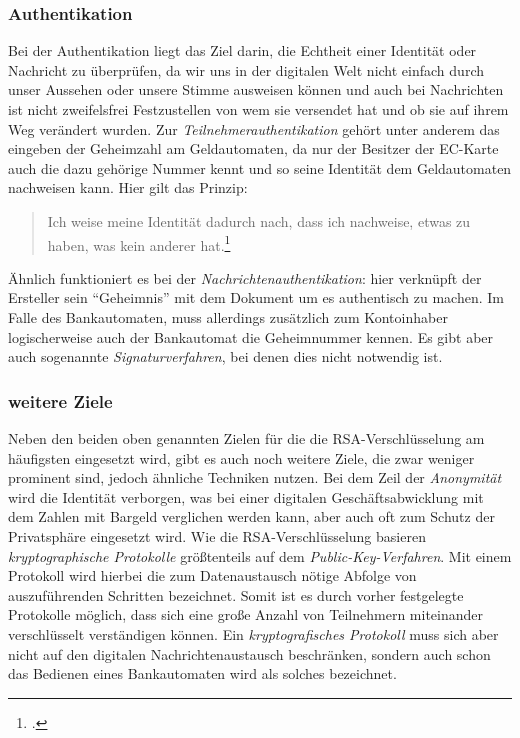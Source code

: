 \documentclass{scrarticle}
\begin{document}
    \subsubsection{Authentikation}
    Bei der Authentikation liegt das Ziel darin, die Echtheit einer Identität oder Nachricht zu überprüfen, da wir uns in der digitalen Welt nicht einfach durch unser Aussehen oder unsere Stimme ausweisen können und auch bei Nachrichten ist nicht zweifelsfrei Festzustellen von wem sie versendet hat und ob sie auf ihrem Weg verändert wurden. Zur \emph{Teilnehmerauthentikation} gehört unter anderem das eingeben der Geheimzahl am Geldautomaten, da nur der Besitzer der EC-Karte auch die dazu gehörige Nummer kennt und so seine Identität dem Geldautomaten nachweisen kann. Hier gilt das Prinzip:
    \begin{quote}
        Ich weise meine Identität dadurch nach, dass ich nachweise, etwas zu haben, was kein anderer hat.\footcite[19]{beutelspacher2015}
    \end{quote}
    Ähnlich funktioniert es bei der \emph{Nachrichtenauthentikation}: hier verknüpft der Ersteller sein \enquote{Geheimnis} mit dem Dokument um es authentisch zu machen. Im Falle des Bankautomaten, muss allerdings zusätzlich zum Kontoinhaber logischerweise auch der Bankautomat die Geheimnummer kennen. Es gibt aber auch sogenannte \emph{Signaturverfahren}, bei denen dies nicht notwendig ist.
    \subsubsection{weitere Ziele}
    Neben den beiden oben genannten Zielen für die die RSA-Verschlüsselung am häufigsten eingesetzt wird, gibt es auch noch weitere Ziele, die zwar weniger prominent sind, jedoch ähnliche Techniken nutzen. Bei dem Zeil der \emph{Anonymität} wird die Identität verborgen, was bei einer digitalen Geschäftsabwicklung mit dem Zahlen mit Bargeld verglichen werden kann, aber auch oft zum Schutz der Privatsphäre eingesetzt wird. Wie die RSA-Verschlüsselung basieren \emph{kryptographische Protokolle} größtenteils auf dem \emph{Public-Key-Verfahren}. Mit einem Protokoll wird hierbei die zum Datenaustausch nötige Abfolge von auszuführenden Schritten bezeichnet. Somit ist es durch vorher festgelegte Protokolle möglich, dass sich eine große Anzahl von Teilnehmern miteinander verschlüsselt verständigen können. Ein \emph{kryptografisches Protokoll} muss sich aber nicht auf den digitalen Nachrichtenaustausch beschränken, sondern auch schon das Bedienen eines Bankautomaten wird als solches bezeichnet.
\end{document}
